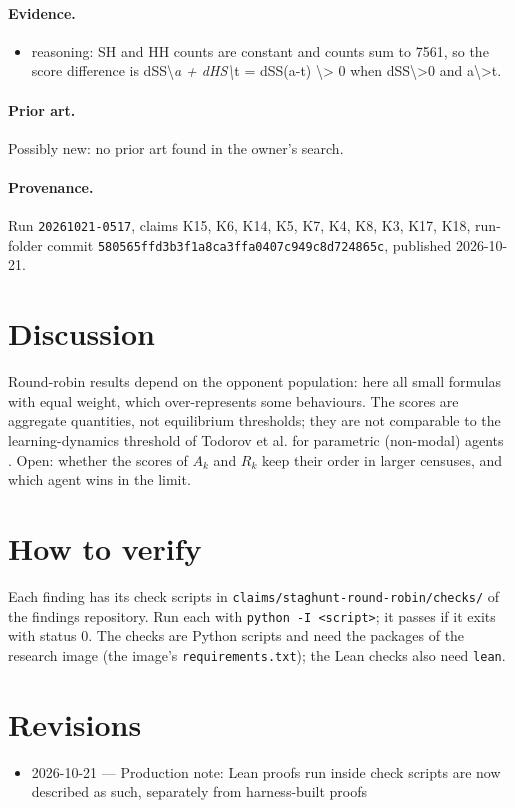 \documentclass{article}
\begin{document}
\paragraph{Evidence.}
\begin{itemize}
\item reasoning: SH and HH counts are constant and counts sum to 7561, so the score difference is dSS\textbackslash{}\emph{a + dHS\textbackslash{}}t = dSS(a-t) \textbackslash{}\textgreater{} 0 when dSS\textbackslash{}\textgreater{}0 and a\textbackslash{}\textgreater{}t.
\end{itemize}

\paragraph{Prior art.} Possibly new: no prior art found in the owner's search.


\paragraph{Provenance.}
Run \texttt{20261021-0517}, claims K15, K6, K14, K5, K7, K4, K8, K3, K17, K18, run-folder commit \texttt{580565ffd3b3f1a8ca3ffa0407c949c8d724865c}, published 2026-10-21.

\section{Discussion}

Round-robin results depend on the opponent population: here all small formulas with equal
weight, which over-represents some behaviours. The scores are aggregate quantities, not
equilibrium thresholds; they are not comparable to the learning-dynamics threshold of Todorov et
al. for parametric (non-modal) agents \cite{todorov2026parametric}. Open: whether the scores of $A_k$ and $R_k$ keep their
order in larger censuses, and which agent wins in the limit.

\section{How to verify}

Each finding has its check scripts in \texttt{claims/staghunt-round-robin/checks/} of the findings repository. Run each with \texttt{python -I <script>}; it passes if it exits with status 0. The checks are Python scripts and need the packages of the research image (the image's \texttt{requirements.txt}); the Lean checks also need \texttt{lean}.

\section{Revisions}

\begin{itemize}
\item 2026-10-21 --- Production note: Lean proofs run inside check scripts are now described as such, separately from harness-built proofs
\end{itemize}



\end{document}
